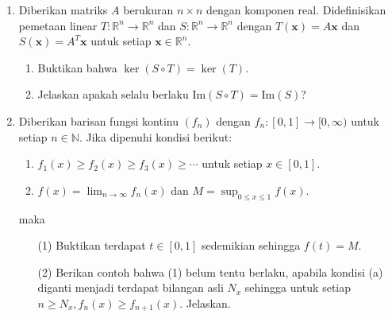 \documentclass[12pt,twoside]{article}
\begin{document}
\begin{enumerate}
          \begin{enumerate}
              \item Bilangan $n$ dan $k$ relatif prima.
              \item Untuk setiap subgrup $A$ dari $G$ berlaku $\{x\in G~|~x^k\in H\}\subseteq H$.
          \end{enumerate}
    \item Diberikan matriks $A$ berukuran $n\times n$ dengan komponen real. Didefinisikan pemetaan linear $T:\mathbb{R}^n\rightarrow \mathbb{R}^n$ dan $S:\mathbb{R}^n\rightarrow\mathbb{R}^n$ dengan $T(\mathbf{x})=A\mathbf{x}$ dan $S(\mathbf{x})=A^T\mathbf{x}$ untuk setiap $\mathbf{x}\in \mathbb{R}^n$.
          \begin{enumerate}
              \item Buktikan bahwa $\ker (S\circ T)=\ker (T)$.
              \item Jelaskan apakah selalu berlaku $\text{Im}(S\circ T)=\text{Im}(S)$?
          \end{enumerate}
    \item Diberikan barisan fungsi kontinu $(f_n)$ dengan $f_n:[0,1]\rightarrow[0,\infty)$ untuk setiap $n\in\mathbb{N}$. Jika dipenuhi kondisi berikut:
          \begin{enumerate}
              \item $f_1(x)\geq f_2(x)\geq f_3(x)\geq \cdots$ untuk setiap $x\in[0,1]$.
              \item $f(x)=\displaystyle\lim_{n\rightarrow\infty} f_n(x)$ dan $\displaystyle M=\sup_{0\leq x\leq 1} f(x)$.
          \end{enumerate}
          maka
          \begin{enumerate}
              \item[(1)] Buktikan terdapat $t\in[0,1]$ sedemikian sehingga $f(t)=M$.
              \item[(2)] Berikan contoh bahwa (1) belum tentu berlaku, apabila kondisi (a) diganti menjadi terdapat bilangan asli $N_x$  sehingga untuk setiap $n\geq N_x, f_n(x)\geq f_{n+1}(x)$. Jelaskan.
          \end{enumerate}
\end{enumerate}
\pagebreak
\end{document}

